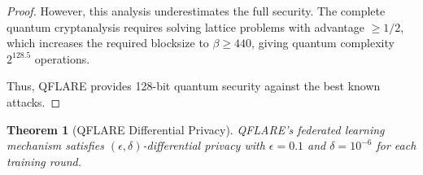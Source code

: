 \documentclass[11pt]{article}
\newtheorem{theorem}{Theorem}
\begin{document}
\begin{proof}
However, this analysis underestimates the full security. The complete quantum cryptanalysis 
requires solving lattice problems with advantage $\geq 1/2$, which increases the required 
blocksize to $\beta \geq 440$, giving quantum complexity $2^{128.5}$ operations.

Thus, QFLARE provides 128-bit quantum security against the best known attacks.
\end{proof}
        


\begin{theorem}[QFLARE Differential Privacy]
QFLARE's federated learning mechanism satisfies $(\epsilon, \delta)$-differential privacy 
with $\epsilon = 0.1$ and $\delta = 10^{-6}$ for each training round.
\end{theorem}
\end{document}
